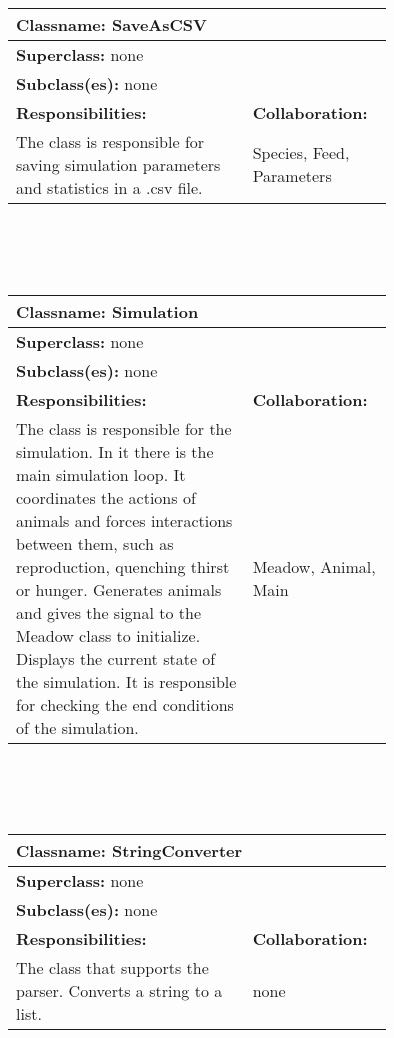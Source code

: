 \documentclass{article}
\begin{document}
\\ \\ \\
\begin{tabular}{|p{0.55\linewidth}|p{0.2\linewidth}|}
\hline
\multicolumn{2}{|l|}{\textbf{Classname:} SaveAsCSV} \\
\hline
\multicolumn{2}{|l|}{\textbf{Superclass:} none} \\
\multicolumn{2}{|l|}{\textbf{Subclass(es):} none} \\
\hline
\textbf{Responsibilities:}  &  \textbf{Collaboration:} \\
The class is responsible for saving simulation parameters and statistics in a .csv file. & Species, Feed, Parameters\\
\hline
\end{tabular}
\\ \\ \\
\begin{tabular}{|p{0.55\linewidth}|p{0.2\linewidth}|}
\hline
\multicolumn{2}{|l|}{\textbf{Classname:} Simulation} \\
\hline
\multicolumn{2}{|l|}{\textbf{Superclass:} none} \\
\multicolumn{2}{|l|}{\textbf{Subclass(es):} none} \\
\hline
\textbf{Responsibilities:}  &  \textbf{Collaboration:} \\
The class is responsible for the simulation. In it there is the main simulation loop. It coordinates the actions of animals and forces interactions between them, such as reproduction, quenching thirst or hunger. Generates animals and gives the signal to the Meadow class to initialize. Displays the current state of the simulation. It is responsible for checking the end conditions of the simulation. & Meadow, Animal, Main \\
\hline
\end{tabular}
\\ \\ \\
\begin{tabular}{|p{0.55\linewidth}|p{0.2\linewidth}|}
\hline
\multicolumn{2}{|l|}{\textbf{Classname:} StringConverter} \\
\hline
\multicolumn{2}{|l|}{\textbf{Superclass:} none} \\
\multicolumn{2}{|l|}{\textbf{Subclass(es):} none} \\
\hline
\textbf{Responsibilities:}  &  \textbf{Collaboration:} \\
The class that supports the parser. Converts a string to a list. & none \\
\hline
\end{tabular}
\end{document}
